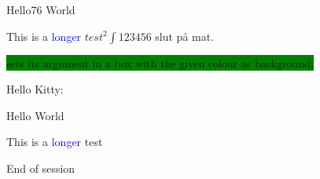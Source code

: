 \documentclass[a4paper,12pt]{report}
\newenvironment{testenv}{Hello Kitty: }{End of session}
\begin{document}
Hello76 \color{red}World\normalcolor

This is a \textcolor{blue}{longer} $test^2 \int{123}{456}$ slut på mat.

\colorbox{green}{sets its argument in a box with the given colour as background;}



\begin{testenv}

Hello \color{red}World\normalcolor

This is a \textcolor{blue}{longer} test

\end{testenv}
\end{document}
